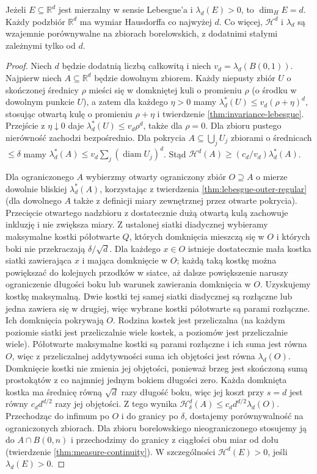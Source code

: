 \begin{twierdzenie}
\label{thm:euclidean-dimension-26}
Jeżeli $E\subseteq\mathbb R^d$ jest mierzalny
w sensie Lebesgue'a i $\lambda_d(E)>0$, to $\dim_HE=d$. Każdy podzbiór
$\mathbb R^d$ ma wymiar Hausdorffa co najwyżej $d$.
Co więcej, $\mathcal H^d$ i $\lambda_d$ są wzajemnie
porównywalne na zbiorach borelowskich, z dodatnimi
stałymi zależnymi tylko od $d$.
\end{twierdzenie}
\begin{proof}
Niech $d$ będzie dodatnią liczbą całkowitą i niech
$v_d=\lambda_d(B(0,1))$. Najpierw niech $A\subseteq\mathbb R^d$
będzie dowolnym zbiorem. Każdy niepusty zbiór $U$ o skończonej średnicy $\rho$ mieści się w domkniętej
kuli o promieniu $\rho$ (o środku w dowolnym punkcie $U$),
a zatem dla każdego $\eta>0$ mamy
$\lambda_d^*(U)\le v_d(\rho+\eta)^d$, stosując otwartą
kulę o promieniu $\rho+\eta$ i twierdzenie
\ref{thm:invariance-lebesgue}. Przejście z $\eta\downarrow0$
daje $\lambda_d^*(U)\le v_d\rho^d$, także dla $\rho=0$.
Dla zbioru pustego nierówność zachodzi bezpośrednio.
Dla pokrycia $A\subseteq\bigcup_jU_j$ zbiorami o
średnicach $\le\delta$ mamy
$\lambda_d^*(A)\le v_d\sum_j(\operatorname{diam}U_j)^d$.
Stąd $\mathcal H^d(A)\ge(c_d/v_d)\lambda_d^*(A)$.

Dla ograniczonego $A$ wybierzmy otwarty ograniczony
zbiór $O\supseteq A$ o mierze dowolnie bliskiej
$\lambda_d^*(A)$, korzystając z twierdzenia
\ref{thm:lebesgue-outer-regular} (dla dowolnego $A$ także
z definicji miary zewnętrznej przez otwarte pokrycia).
Przecięcie otwartego nadzbioru z dostatecznie dużą otwartą
kulą zachowuje inkluzję i nie zwiększa miary. Z ustalonej siatki diadycznej wybieramy maksymalne
kostki półotwarte $Q$, których domknięcia mieszczą się
w $O$ i których boki nie przekraczają $\delta/\sqrt d$.
Dla każdego $x\in O$ istnieje dostatecznie mała kostka
siatki zawierająca $x$ i mająca domknięcie w $O$;
każdą taką kostkę można powiększać do kolejnych
przodków w siatce, aż dalsze powiększenie naruszy
ograniczenie długości boku lub warunek zawierania
domknięcia w $O$. Uzyskujemy kostkę maksymalną.
Dwie kostki tej samej siatki diadycznej są rozłączne
lub jedna zawiera się w drugiej, więc wybrane kostki
półotwarte są parami rozłączne. Ich domknięcia pokrywają $O$.
Rodzina kostek jest przeliczalna (na każdym poziomie
siatki jest przeliczalnie wiele kostek, a poziomów jest
przeliczalnie wiele). Półotwarte maksymalne kostki są
parami rozłączne i ich suma jest równa $O$, więc z
przeliczalnej addytywności suma ich objętości jest
równa $\lambda_d(O)$. Domknięcie kostki nie zmienia
jej objętości, ponieważ brzeg jest skończoną sumą
prostokątów z co najmniej jednym bokiem długości zero. Każda domknięta kostka
ma średnicę równą $\sqrt d$ razy długość boku,
więc jej koszt przy $s=d$ jest równy $c_dd^{d/2}$
razy jej objętości. Z tego wynika
$\mathcal H^d_\delta(A)\le c_dd^{d/2}\lambda_d(O)$.
Przechodząc do infimum po $O$ i do granicy po $\delta$,
dostajemy porównywalność na ograniczonych zbiorach.
Dla zbioru borelowskiego nieograniczonego stosujemy
ją do $A\cap B(0,n)$ i przechodzimy do granicy
z ciągłości obu miar od dołu (twierdzenie
\ref{thm:measure-continuity}). W szczególności $\mathcal H^d(E)>0$, jeśli
$\lambda_d(E)>0$.


\end{proof}
